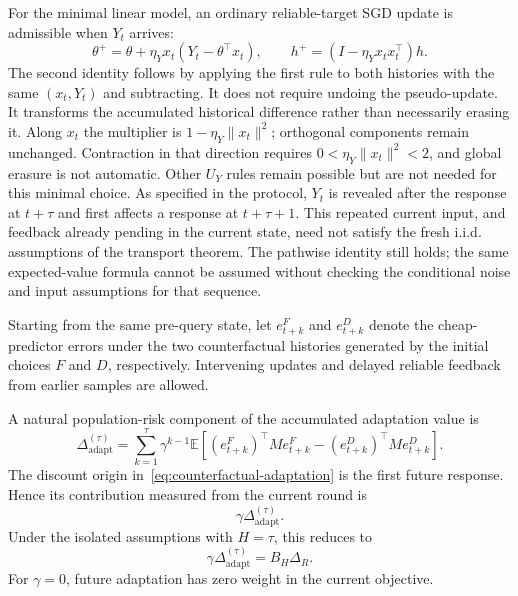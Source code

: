For the minimal linear model, an ordinary reliable-target SGD update is
admissible when $Y_t$ arrives:
\begin{equation}
    \theta^+=\theta+\eta_Yx_t(Y_t-\theta^\top x_t),\qquad
    h^+=(I-\eta_Yx_tx_t^\top)h.
    \label{eq:reliable-transport}
\end{equation}
The second identity follows by applying the first rule to both histories
with the same $(x_t,Y_t)$ and subtracting. It does not require undoing the
pseudo-update. It transforms the accumulated historical difference rather
than necessarily erasing it. Along $x_t$ the multiplier is
$1-\eta_Y\|x_t\|^2$; orthogonal components remain unchanged. Contraction
in that direction requires $0<\eta_Y\|x_t\|^2<2$, and global erasure is
not automatic. Other $U_Y$ rules remain possible but are not needed for
this minimal choice. As specified in the protocol, $Y_t$ is revealed after
the response at $t+\tau$ and first affects a response at $t+\tau+1$.
This repeated current input, and feedback already pending in the current
state, need not satisfy the fresh i.i.d. assumptions of the transport
theorem. The pathwise identity still holds; the same expected-value
formula cannot be assumed without checking the conditional noise and
input assumptions for that sequence.

Starting from the same pre-query state, let $e_{t+k}^{F}$ and
$e_{t+k}^{D}$ denote the cheap-predictor errors under the two
counterfactual histories generated by the initial choices $F$ and $D$,
respectively. Intervening updates and delayed reliable feedback from earlier
samples are allowed.

A natural population-risk component of the accumulated adaptation value is
\begin{equation}
    \Delta_{\mathrm{adapt}}^{(\tau)}
    =
    \sum_{k=1}^{\tau}
    \gamma^{k-1}
    \mathbb E\!\left[
        (e_{t+k}^{F})^\top M e_{t+k}^{F}
        -
        (e_{t+k}^{D})^\top M e_{t+k}^{D}
    \right].
    \label{eq:counterfactual-adaptation}
\end{equation}
The discount origin in~\eqref{eq:counterfactual-adaptation} is the first
future response. Hence its contribution measured from the current round is
\begin{equation}
    \gamma\Delta_{\mathrm{adapt}}^{(\tau)}.
\end{equation}
Under the isolated assumptions with $H=\tau$, this reduces to
\begin{equation}
    \gamma\Delta_{\mathrm{adapt}}^{(\tau)}
    =
    B_H\Delta_R.
\end{equation}
For $\gamma=0$, future adaptation has zero weight in the current objective.

